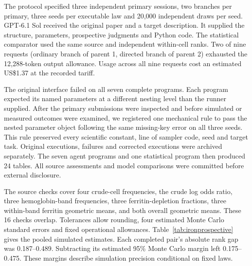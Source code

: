 The protocol specified three independent primary sessions, two branches per primary, three seeds per executable law and 20,000 independent draws per seed. GPT-6.1 Sol received the original paper and a target description. It supplied the structure, parameters, prospective judgments and Python code. The statistical comparator used the same source and independent within-cell ranks. Two of nine requests (ordinary branch of parent 1, directed branch of parent 2) exhausted the 12,288-token output allowance. Usage across all nine requests cost an estimated US\$1.37 at the recorded tariff.

The original interface failed on all seven complete programs. Each program expected its named parameters at a different nesting level than the runner supplied. After the primary submissions were inspected and before simulated or measured outcomes were examined, we registered one mechanical rule to pass the nested parameter object following the same missing-key error on all three seeds. This rule preserved every scientific constant, line of sampler code, seed and target task. Original executions, failures and corrected executions were archived separately. The seven agent programs and one statistical program then produced 24 tables. All source assessments and model comparisons were committed before external disclosure.

The source checks cover four crude-cell frequencies, the crude log odds ratio, three hemoglobin-band frequencies, three ferritin-depletion fractions, three within-band ferritin geometric means, and both overall geometric means. These 16 checks overlap. Tolerances allow rounding, four estimated Monte Carlo standard errors and fixed operational allowances. Table~\ref{tab:ironprospective} gives the pooled simulated estimates. Each completed pair's absolute rank gap was 0.187--0.489. Subtracting its estimated 95\% Monte Carlo margin left 0.175--0.475. These margins describe simulation precision conditional on fixed laws.

